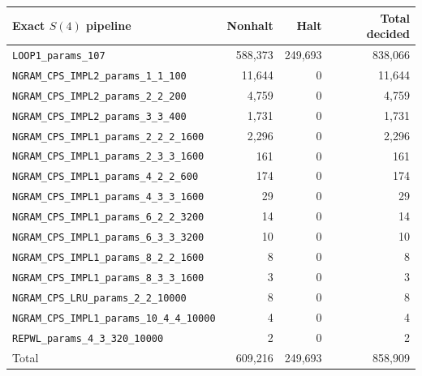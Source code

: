 \documentclass[a4paper,british]{article}
\theoremstyle{definition} %
\numberwithin{equation}{section}
\theoremstyle{definition} %
\begin{document}
\begin{table}[h!]
    \centering
    \scriptsize
    \begin{tabular}{|lrrr|}
        \hline
        Exact $S(4)$ pipeline                               & Nonhalt   & Halt      & Total decided \\
        \hline
        \texttt{LOOP1\_params\_107}                         & 588{,}373 & 249{,}693 & 838{,}066     \\
        \texttt{NGRAM\_CPS\_IMPL2\_params\_1\_1\_100}       & 11{,}644  & 0         & 11{,}644      \\
        \texttt{NGRAM\_CPS\_IMPL2\_params\_2\_2\_200}       & 4{,}759   & 0         & 4{,}759       \\
        \texttt{NGRAM\_CPS\_IMPL2\_params\_3\_3\_400}       & 1{,}731   & 0         & 1{,}731       \\
        \texttt{NGRAM\_CPS\_IMPL1\_params\_2\_2\_2\_1600}   & 2{,}296   & 0         & 2{,}296       \\
        \texttt{NGRAM\_CPS\_IMPL1\_params\_2\_3\_3\_1600}   & 161       & 0         & 161           \\
        \texttt{NGRAM\_CPS\_IMPL1\_params\_4\_2\_2\_600}    & 174       & 0         & 174           \\
        \texttt{NGRAM\_CPS\_IMPL1\_params\_4\_3\_3\_1600}   & 29        & 0         & 29            \\
        \texttt{NGRAM\_CPS\_IMPL1\_params\_6\_2\_2\_3200}   & 14        & 0         & 14            \\
        \texttt{NGRAM\_CPS\_IMPL1\_params\_6\_3\_3\_3200}   & 10        & 0         & 10            \\
        \texttt{NGRAM\_CPS\_IMPL1\_params\_8\_2\_2\_1600}   & 8         & 0         & 8             \\
        \texttt{NGRAM\_CPS\_IMPL1\_params\_8\_3\_3\_1600}   & 3         & 0         & 3             \\
        \texttt{NGRAM\_CPS\_LRU\_params\_2\_2\_10000}       & 8         & 0         & 8             \\
        \texttt{NGRAM\_CPS\_IMPL1\_params\_10\_4\_4\_10000} & 4         & 0         & 4             \\
        \texttt{REPWL\_params\_4\_3\_320\_10000}            & 2         & 0         & 2             \\
        \hline
        Total                                               & 609{,}216 & 249{,}693 & 858{,}909     \\
        \hline
    \end{tabular}
\end{table}
\end{document}

